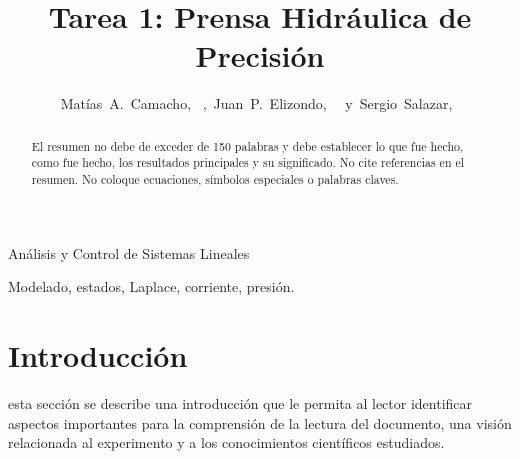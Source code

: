 \documentclass[journal]{IEEEtran}
\begin{document}
%
\title{Tarea 1: Prensa Hidráulica de Precisión}


\author{Matías~A.~Camacho,~
        ,~Juan~P.~Elizondo,~
        ~y~Sergio~Salazar,~
}


%
{Análisis y Control de Sistemas Lineales}


\maketitle


\begin{abstract}
El resumen no debe de exceder de 150 palabras y debe establecer lo que fue hecho, como fue hecho, los resultados principales y su significado. No cite referencias en el resumen. No coloque ecuaciones, símbolos especiales o palabras claves.
\end{abstract}

\begin{IEEEkeywords}
Modelado, estados, Laplace, corriente, presión.
\end{IEEEkeywords}


\section{Introducción}

 esta sección se describe una introducción que le permita al lector identificar aspectos importantes para la comprensión de la lectura del documento, una visión relacionada al experimento y a los conocimientos científicos estudiados.


\end{document}
